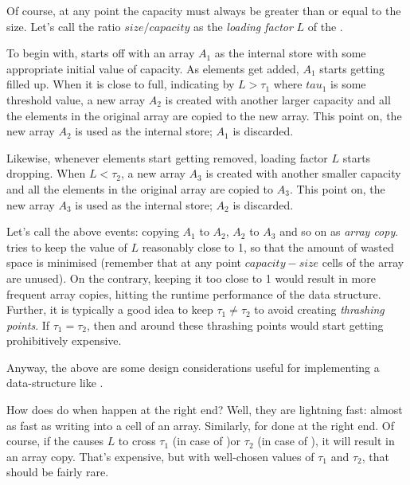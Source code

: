 \documentclass[12pt,a4paper]{article}
\begin{document}
Of course, at any point the capacity must always be greater than or equal to the size. Let's call the ratio $size/capacity$ as the \emph{loading factor} $L$ of the \lstinline@ArrayList@.

To begin with, \lstinline@ArrayList@ starts off with an array $A_1$ as the internal store with some appropriate initial value of capacity. As elements get added, $A_1$ starts getting filled up. When it is close to full, indicating by $L > \tau_1$ where $tau_1$ is some threshold value, a new array $A_2$ is created with another larger capacity and all the elements in the original array are copied to the new array. This point on, the new array $A_2$ is used as the internal store; $A_1$ is discarded.

Likewise, whenever elements start getting removed, loading factor $L$ starts dropping. When $L < \tau_2$,   a new array $A_3$ is created with another smaller capacity and all the elements in the original array are copied to $A_3$. This point on, the new array $A_3$ is used as the internal store; $A_2$ is discarded.

Let's call the above events: copying $A_1$ to $A_2$, $A_2$ to $A_3$ and so on as \emph{array copy}.
\lstinline@ArrayList@ tries to keep the value of $L$ reasonably close to 1, so that the amount of wasted space is minimised (remember that at any point $capacity - size$ cells of the array are unused). On the contrary, keeping it too close to 1 would result in more frequent array copies, hitting the runtime performance of the data structure. Further, it is typically a good idea to keep $\tau_1 \neq \tau_2$ to avoid creating \emph{thrashing points}. If $\tau_1 = \tau_2$, then \lstinline@add@s and \lstinline@remove@s around these thrashing points would start getting prohibitively expensive.

Anyway, the above are some design considerations useful for implementing a data-structure like \lstinline@ArrayList@.

How does \lstinline@ArrayList@ do when \lstinline@add@s happen at the right end? Well, they are lightning fast: almost as fast as writing into a cell of an array. Similarly, for \lstinline@remove@s done at the right end. Of course, if the \lstinline@add@ causes $L$ to cross $\tau_1$ (in case of \lstinline@add@)or $\tau_2$ (in case of \lstinline@remove@), it will result in an array copy. That's expensive, but with well-chosen values of $\tau_1$ and $\tau_2$, that should be fairly rare.
\end{document}
